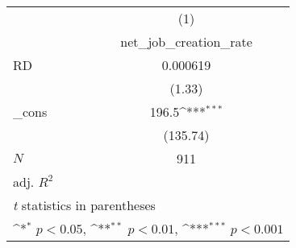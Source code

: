 {
\def\sym#1{\ifmmode^{#1}\else\(^{#1}\)\fi}
\begin{tabular}{l*{1}{c}}
\toprule
            &\multicolumn{1}{c}{(1)}\\
            &\multicolumn{1}{c}{net\_job\_creation\_rate}\\
\midrule
RD          &    0.000619         \\
            &      (1.33)         \\
\addlinespace
\_cons      &       196.5\sym{***}\\
            &    (135.74)         \\
\midrule
\(N\)       &         911         \\
adj. \(R^{2}\)&                     \\
\bottomrule
\multicolumn{2}{l}{\footnotesize \textit{t} statistics in parentheses}\\
\multicolumn{2}{l}{\footnotesize \sym{*} \(p<0.05\), \sym{**} \(p<0.01\), \sym{***} \(p<0.001\)}\\
\end{tabular}
}
